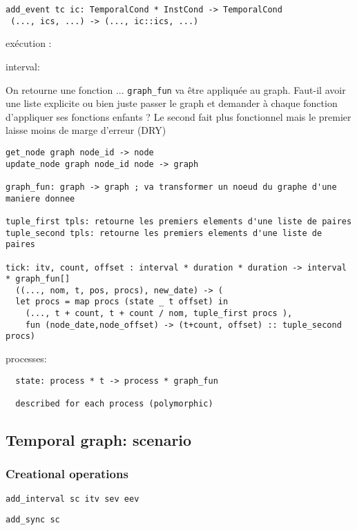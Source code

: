 \documentclass[applsci,article,submit,moreauthors,pdftex,10pt,a4paper]{mdpi}
\begin{document}
\begin{lstlisting}
add_event tc ic: TemporalCond * InstCond -> TemporalCond
 (..., ics, ...) -> (..., ic::ics, ...)
\end{lstlisting}

exécution : 

interval: 

On retourne une fonction ... \lstinline|graph_fun| va être appliquée au graph. Faut-il avoir une liste explicite ou bien juste passer le graph et demander à chaque fonction d'appliquer ses fonctions enfants ? Le second fait plus fonctionnel mais le premier laisse moins de marge d'erreur (DRY)
\begin{lstlisting}
get_node graph node_id -> node
update_node graph node_id node -> graph

graph_fun: graph -> graph ; va transformer un noeud du graphe d'une maniere donnee

tuple_first tpls: retourne les premiers elements d'une liste de paires
tuple_second tpls: retourne les premiers elements d'une liste de paires

tick: itv, count, offset : interval * duration * duration -> interval * graph_fun[]
  ((..., nom, t, pos, procs), new_date) -> (
  let procs = map procs (state _ t offset) in 
    (..., t + count, t + count / nom, tuple_first procs ),  
    fun (node_date,node_offset) -> (t+count, offset) :: tuple_second procs)

\end{lstlisting}

processes:
\begin{lstlisting}
  state: process * t -> process * graph_fun
  
  described for each process (polymorphic)
\end{lstlisting}

\subsection{Temporal graph: scenario}\label{sec.scenario}


\subsubsection{Creational operations}

\begin{lstlisting}
add_interval sc itv sev eev
\end{lstlisting}
\begin{lstlisting}
add_sync sc
\end{lstlisting}
\end{document}
